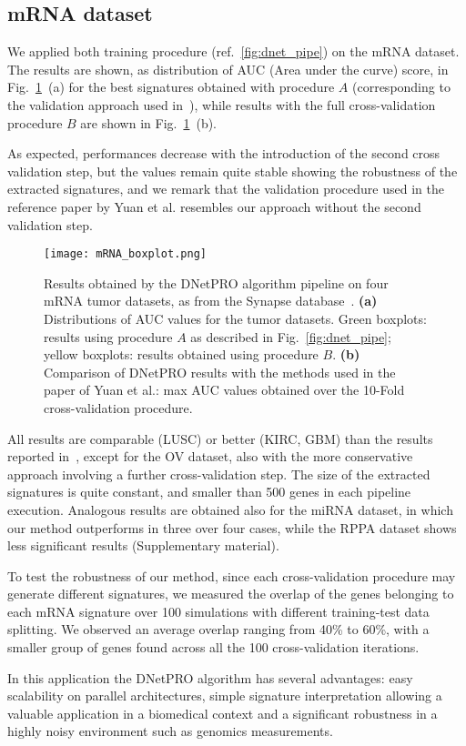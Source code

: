 \documentclass{standalone}
\begin{document}
\subsection[mRNA data]{mRNA dataset}\label{synapse:mRNA}

We applied both training procedure (ref.~\ref{fig:dnet_pipe}) on the mRNA dataset.
The results are shown, as distribution of AUC (Area under the curve) score, in Fig.~\ref{fig:dnet_results}~(a) for the best signatures obtained with procedure $A$ (corresponding to the validation approach used in~\cite{Yuan2014}), while results with the full cross-validation procedure $B$ are shown in Fig.~\ref{fig:dnet_results}~(b).

As expected, performances decrease with the introduction of the second cross validation step, but the values remain quite stable showing the robustness of the extracted signatures, and we remark that the validation procedure used in the reference paper by Yuan et al. resembles our approach without the second validation step.

\begin{figure}[htbp]
\texttt{[image: mRNA\_boxplot.png]}
\qquad\qquad
\centering
\def\svgwidth{0.45\textwidth}

\caption{Results obtained by the DNetPRO algorithm pipeline on four mRNA tumor datasets, as from the Synapse database~\cite{Yuan2014}.
\textbf{(a)} Distributions of AUC values for the tumor datasets. Green boxplots: results using procedure $A$ as described in Fig.~\ref{fig:dnet_pipe}; yellow boxplots: results obtained using procedure $B$.
\textbf{(b)} Comparison of DNetPRO results with the methods used in the paper of Yuan et al.: max AUC values obtained over the 10-Fold cross-validation procedure.
}
\label{fig:dnet_results}
\end{figure}

All results are comparable (LUSC) or better (KIRC, GBM) than the results reported in~\cite{Yuan2014}, except for the OV dataset, also with the more conservative approach involving a further cross-validation step.
The size of the extracted signatures is quite constant, and smaller than 500 genes in each pipeline execution.
Analogous results are obtained also for the miRNA dataset, in which our method outperforms in three over four cases, while the RPPA dataset shows less significant results (Supplementary material).

To test the robustness of our method, since each cross-validation procedure may generate different signatures, we measured the overlap of the genes belonging to each mRNA signature over 100 simulations with different training-test data splitting.
We observed an average overlap ranging from 40\% to 60\%, with a smaller group of genes found across all the 100 cross-validation iterations.

In this application the DNetPRO algorithm has several advantages: easy scalability on parallel architectures, simple signature interpretation allowing a valuable application in a biomedical context and a significant robustness in a highly noisy environment such as genomics measurements.
\end{document}
